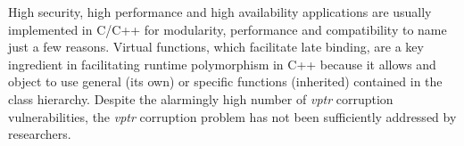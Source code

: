
% 



High security, high performance and high availability 
applications are usually implemented in C/C++ for modularity, 
performance and compatibility to name just a few reasons.
Virtual functions, which facilitate late binding,
are a key ingredient in facilitating runtime polymorphism
in C++ because it allows and object to use general (its own) 
or specific functions (inherited) contained in the class hierarchy.
Despite the alarmingly high number of \textit{vptr} corruption
vulnerabilities, the \textit{vptr} corruption problem has not
been sufficiently addressed by researchers.

